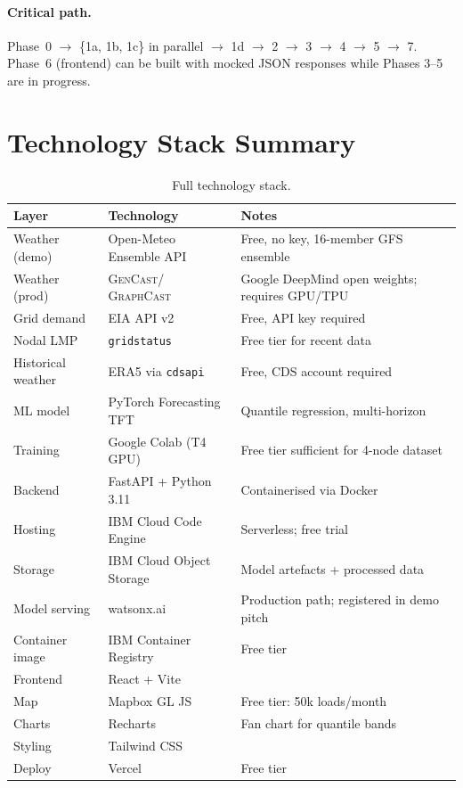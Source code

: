 \documentclass[10pt,letterpaper]{article}
\newcommand{\graphcast}{\textsc{GraphCast}\xspace}
\newcommand{\gencast}{\textsc{GenCast}\xspace}
\newcommand{\tft}{\textsc{TFT}\xspace}
\begin{document}
\paragraph{Critical path.}
Phase~0 $\to$ \{1a, 1b, 1c\} in parallel $\to$ 1d $\to$ 2 $\to$ 3 $\to$ 4 $\to$ 5 $\to$ 7.
Phase~6 (frontend) can be built with mocked JSON responses while Phases 3--5 are
in progress.

\section{Technology Stack Summary}

\begin{table}[H]
\centering
\caption{Full technology stack.}
\label{tab:stack}
\renewcommand{\arraystretch}{1.25}
\begin{tabularx}{\linewidth}{@{}llX@{}}
\toprule
\textbf{Layer} & \textbf{Technology} & \textbf{Notes} \\
\midrule
Weather (demo)     & Open-Meteo Ensemble API   & Free, no key, 16-member GFS ensemble \\
Weather (prod)     & \gencast / \graphcast     & Google DeepMind open weights; requires GPU/TPU \\
Grid demand        & EIA API v2                & Free, API key required \\
Nodal LMP          & \texttt{gridstatus}       & Free tier for recent data \\
Historical weather & ERA5 via \texttt{cdsapi}  & Free, CDS account required \\
\midrule
ML model           & PyTorch Forecasting \tft  & Quantile regression, multi-horizon \\
Training           & Google Colab (T4 GPU)     & Free tier sufficient for 4-node dataset \\
\midrule
Backend            & FastAPI + Python 3.11     & Containerised via Docker \\
Hosting            & IBM Cloud Code Engine     & Serverless; free trial \\
Storage            & IBM Cloud Object Storage  & Model artefacts + processed data \\
Model serving      & watsonx.ai                & Production path; registered in demo pitch \\
Container image    & IBM Container Registry    & Free tier \\
\midrule
Frontend           & React + Vite              & \\
Map                & Mapbox GL JS              & Free tier: 50k loads/month \\
Charts             & Recharts                  & Fan chart for quantile bands \\
Styling            & Tailwind CSS              & \\
Deploy             & Vercel                    & Free tier \\
\bottomrule
\end{tabularx}
\end{table}
\end{document}
